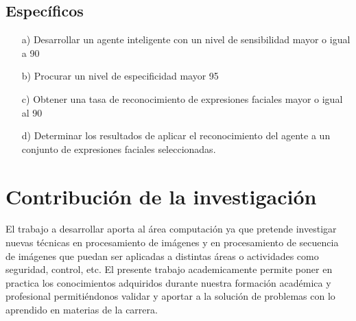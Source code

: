 \subsection{Específicos}

\begin{enumerate}
\item[a)] Desarrollar un agente inteligente con un nivel de sensibilidad mayor o igual a 90%
\item[b)] Procurar un nivel de especificidad mayor 95%
\item[c)] Obtener una tasa de reconocimiento de expresiones faciales mayor o igual al 90%
\item[d)] Determinar los resultados de aplicar el reconocimiento del agente a un conjunto de
expresiones faciales seleccionadas.
\end{enumerate}

\section{Contribución de la investigación}

El trabajo a desarrollar aporta al área computación ya que pretende investigar nuevas técnicas
en procesamiento de imágenes y en procesamiento de secuencia de imágenes que puedan
ser aplicadas a distintas áreas o actividades como seguridad, control, etc.
\vskip 0.3cm
El presente trabajo academicamente permite poner en practica los conocimientos adquiridos
durante nuestra formación académica y profesional permitiéndonos validar y aportar a la
solución de problemas con lo aprendido en materias de la carrera. 

